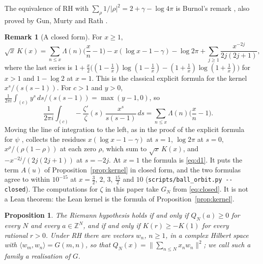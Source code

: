 \documentclass[11pt]{article}
\newtheorem{proposition}[theorem]{Proposition}
\theoremstyle{definition}
\newtheorem*{remark}{Remark}
\newcommand{\KH}{K}
\begin{document}
The equivalence of RH with $\sum_\rho 1/|\rho|^2 = 2 + \gamma - \log 4\pi$ is Burnol's remark \cite{burnol98}, also
proved by Gun, Murty and Rath \cite{gun-murty-rath}.

\begin{remark}[A closed form]
For $x \ge 1$,
\begin{equation}\label{eq:closed}
\sqrt x\,\KH(x) = \sum_{n \le x} \Lambda(n)\Big(\frac xn - 1\Big) - x(\log x - 1 - \gamma) - \log 2\pi + \sum_{j \ge
1} \frac{x^{-2j}}{2j(2j + 1)},
\end{equation}
where the last series is $1 + \frac x2\big((1 - \frac1x)\log(1 - \frac1x) - (1 + \frac1x)\log(1 + \frac1x)\big)$ for
$x > 1$ and $1 - \log 2$ at $x = 1$. This is the classical explicit formula for the kernel $x^s/(s(s - 1))$. For $c >
1$ and $y > 0$, $\frac{1}{2\pi i} \int_{(c)} y^s\,ds/(s(s - 1)) = \max(y - 1, 0)$, so
\[
\frac{1}{2\pi i} \int_{(c)} -\frac{\zeta'}{\zeta}(s)\,\frac{x^s}{s(s
- 1)}\,ds = \sum_{n \le x} \Lambda(n)\Big(\frac xn - 1\Big).
\]
Moving the line of integration to the left, as in the proof of the explicit formula for $\psi$
\cite[Chapter~17]{davenport}, collects the residues $x(\log x - 1 - \gamma)$ at $s = 1$, $\log 2\pi$ at $s = 0$,
$x^\rho/(\rho(1 - \rho))$ at each zero $\rho$, which sum to $\sqrt x\,\KH(x)$, and $-x^{-2j}/(2j(2j + 1))$ at $s =
-2j$. At $x = 1$ the formula is \eqref{eq:d1}. It puts the term $A(u)$ of Proposition~\ref{prop:kernel} in closed
form, and the two formulas agree to within $10^{-15}$ at $x = \frac32$, $2$, $3$, $\frac{15}2$ and $10$
(\texttt{scripts/ball\_orbit.py -{}-closed}). The computations for $\zeta$ in this paper take $G_N$ from
\eqref{eq:closed}. It is not a Lean theorem: the Lean kernel is the formula of Proposition~\ref{prop:kernel}.
\end{remark}

\begin{proposition}\label{prop:positivity}
The Riemann hypothesis holds if and only if $Q_N(a) \ge 0$ for every $N$ and every $a \in \mathbb Z^N$, and if and
only if $\KH(r) \ge -\KH(1)$ for every rational $r > 0$. Under RH there are vectors $w_n$, $n \ge 1$, in a complex
Hilbert space with $\langle w_m, w_n\rangle = G(m, n)$, so that $Q_N(x) = \|\sum_{n \le N} x_n w_n\|^2$; we call such a
family a realisation of $G$.
\end{proposition}
\end{document}
